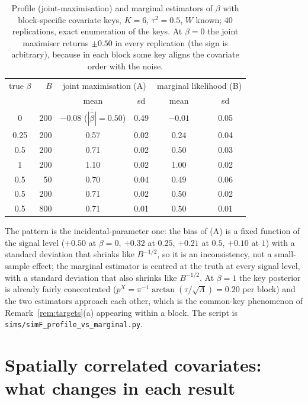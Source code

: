 \documentclass[11pt]{article}
\theoremstyle{definition}
\begin{document}
\begin{table}[ht]\centering\small
\begin{tabular}{crcccc}\toprule
true $\beta$ & $B$ & \multicolumn{2}{c}{joint maximisation (A)} & \multicolumn{2}{c}{marginal likelihood (B)}\\
 & & mean & sd & mean & sd\\\midrule
0    & 200 & $-0.08$ ($\overline{|\hat\beta|}=0.50$) & 0.49 & $-0.01$ & 0.05\\
0.25 & 200 & 0.57 & 0.02 & 0.24 & 0.04\\
0.5  & 200 & 0.71 & 0.02 & 0.50 & 0.03\\
1    & 200 & 1.10 & 0.02 & 1.00 & 0.02\\\midrule
0.5  &  50 & 0.70 & 0.04 & 0.49 & 0.06\\
0.5  & 200 & 0.71 & 0.02 & 0.50 & 0.02\\
0.5  & 800 & 0.71 & 0.01 & 0.50 & 0.01\\\bottomrule
\end{tabular}
\caption{Profile (joint-maximisation) and marginal estimators of $\beta$ with block-specific covariate keys, $K=6$, $\tau^2=0.5$, $W$ known; 40 replications, exact enumeration of the keys. At $\beta=0$ the joint maximiser returns $\pm0.50$ in every replication (the sign is arbitrary), because in each block some key aligns the covariate order with the noise.}
\label{tab:profile}
\end{table}

The pattern is the incidental-parameter one: the bias of (A) is a fixed function of the signal level ($+0.50$ at $\beta=0$, $+0.32$ at $0.25$, $+0.21$ at $0.5$, $+0.10$ at $1$) with a standard deviation that shrinks like $B^{-1/2}$, so it is an inconsistency, not a small-sample effect; the marginal estimator is centred at the truth at every signal level, with a standard deviation that also shrinks like $B^{-1/2}$. At $\beta=1$ the key posterior is already fairly concentrated ($p^X=\pi^{-1}\arctan(\tau/\sqrt\Lambda)=0.20$ per block) and the two estimators approach each other, which is the common-key phenomenon of Remark~\ref{rem:targets}(a) appearing within a block. The script is \texttt{sims/simF\_profile\_vs\_marginal.py}.

\section{Spatially correlated covariates: what changes in each result}\label{sec:spatialX}
\end{document}

